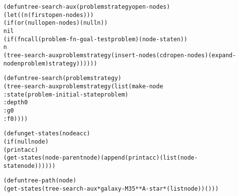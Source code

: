 \begin{aibox}{\code}
\begin{alltt}
(defun tree-search-aux (problem strategy open-nodes)
    (let ((n (first open-nodes)))
        (if ( or (null open-nodes) (null n))
            nil
            (if  (fncall (problem-fn-goal-test problem) (node-state n))
              n
              (tree-search-aux problem strategy  (insert-nodes (cdr open-nodes)  (expand-node n problem) strategy))))))

(defun tree-search (problem strategy)
  (tree-search-aux problem strategy (list (make-node
  										:state (problem-initial-state problem)
  										:depth 0
  										:g 0
  										:f 0))))




(defun get-states (node acc)
	(if (null node)
		(print acc)
		(get-states (node-parent node) (append (print acc) (list (node-state node))))))

(defun tree-path (node)
	(get-states (tree-search-aux *galaxy-M35* *A-star* (list node)) ()))



\end{alltt}
\end{aibox}
